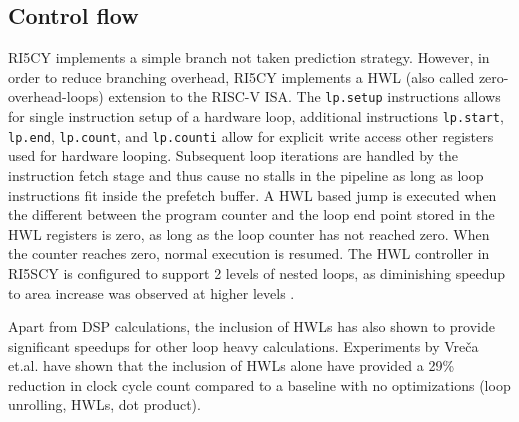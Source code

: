 \documentclass[../bachelor_paper.tex]{subfiles}
\begin{document}
\subsection{Control flow}
    \label{sub:plat/ip/ctrl}
RI5CY implements a simple branch not taken prediction strategy. However, in order to reduce branching overhead, RI5CY implements a \acl{HWL} (also called zero-overhead-loops) extension to the RISC-V \ac{ISA}. The \texttt{lp.setup} instructions allows for single instruction setup of a hardware loop, additional instructions \texttt{lp.start}, \texttt{lp.end}, \texttt{lp.count}, and \texttt{lp.counti} allow for explicit write access other registers used for hardware looping. Subsequent loop iterations are handled by the instruction fetch stage and thus cause no stalls in the pipeline as long as loop instructions fit inside the prefetch buffer. A \ac{HWL} based jump is executed when the different between the program counter and the loop end point stored in the \ac{HWL} registers is zero, as long as the loop counter has not reached zero. When the counter reaches zero, normal execution is resumed. The \ac{HWL} controller in RI5SCY is configured to support 2 levels of nested loops, as diminishing speedup to area increase was observed at higher levels \cite{gautschiNearThresholdRISCVCore2017}.

Apart from \ac{DSP} calculations, the inclusion of \acp{HWL} has also shown to provide significant speedups for other loop heavy calculations. Experiments by Vre\v{c}a et.al. \cite{vrecaAcceleratingDeepLearning2020} have shown that the inclusion of \acp{HWL} alone have provided a 29\% reduction in clock cycle count compared to a baseline with no optimizations (loop unrolling, \acp{HWL}, dot product).
\end{document}

